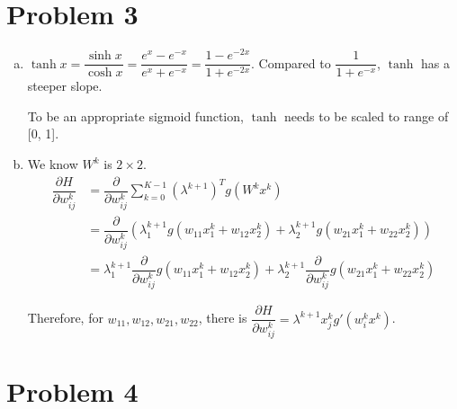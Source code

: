\documentclass[10pt]{article}
\begin{document}
\section*{Problem 3}
\begin{enumerate}[(a)]

\item  $\tanh x = \dfrac{\sinh x}{\cosh x} = \dfrac{e^x - e^{-x}}{e^x
+ e^{-x}} = \dfrac{1 - e^{-2x}}{1 + e^{-2x}}$. Compared to $\dfrac{1}{1
+ e^{-x}}$, $\tanh$ has a steeper slope.

To be an appropriate sigmoid function, $\tanh$ needs to be scaled to
range of [0, 1].

\item We know $W^k$ is $2 \times 2$.
\begin{align}
\dfrac{\partial H}{\partial w_{ij}^k} &= \dfrac{\partial}{\partial
w_{ij}^k} \sum\limits_{k=0}^{K-1} (\lambda^{k+1})^T g(W^kx^k)\\
&= \dfrac{\partial}{\partial w_{ij}^k} (\lambda_1^{k+1} g(w_{11}x_1^k
+ w_{12}x_2^k) + \lambda_2^{k+1} g(w_{21}x_1^k + w_{22}x_2^k))\\
&= \lambda_1^{k+1} \dfrac{\partial}{\partial w_{ij}^k} g(w_{11}x_1^k
+ w_{12}x_2^k) + \lambda_2^{k+1} \dfrac{\partial}{\partial w_{ij}^k}
g(w_{21}x_1^k + w_{22}x_2^k)
\end{align}

Therefore, for $w_{11}, w_{12}, w_{21}, w_{22}$, there is
$\dfrac{\partial H}{\partial w_{ij}^k} = \lambda^{k+1} x_j^k g'(w_i^k x^k)$.

\end{enumerate}

\section*{Problem 4}
\end{document}
